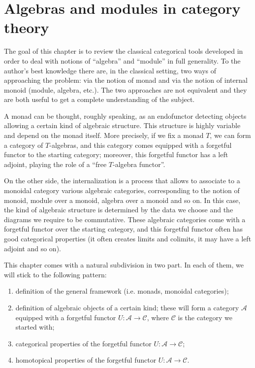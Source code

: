 \chapter{Algebras and modules in category theory}

\begin{refsection}

The goal of this chapter is to review the classical categorical tools developed in order to deal with notions of ``algebra'' and ``module'' in full generality. To the author's best knowledge there are, in the classical setting, two ways of approaching the problem: via the notion of monad and via the notion of internal monoid (module, algebra, etc.). The two approaches are not equivalent and they are both useful to get a complete understanding of the subject.

A monad can be thought, roughly speaking, as an endofunctor detecting objects allowing a certain kind of algebraic structure. This structure is highly variable and depend on the monad itself. More precisely, if we fix a monad $T$, we can form a category of $T$-algebras, and this category comes equipped with a forgetful functor to the starting category; moreover, this forgetful functor has a left adjoint, playing the role of a ``free $T$-algebra functor''.

On the other side, the internalization is a process that allows to associate to a monoidal category various algebraic categories, corresponding to the notion of monoid, module over a monoid, algebra over a monoid and so on. In this case, the kind of algebraic structure is determined by the data we choose and the diagrams we require to be commutative. These algebraic categories come with a forgetful functor over the starting category, and this forgetful functor often has good categorical properties (it often creates limits and colimits, it may have a left adjoint and so on).

This chapter comes with a natural subdivision in two part. In each of them, we will stick to the following pattern:
\begin{enumerate}
\item definition of the general framework (i.e. monads, monoidal categories);
\item definition of algebraic objects of a certain kind; these will form a category $\mathcal A$ equipped with a forgetful functor $U \colon \mathcal A \to \mathcal C$, where $\mathcal C$ is the category we started with;
\item categorical properties of the forgetful functor $U \colon \mathcal A \to \mathcal C$;
\item homotopical properties of the forgetful functor $U \colon \mathcal A \to \mathcal C$.
\end{enumerate}


\end{refsection}
